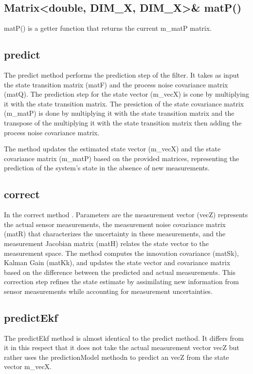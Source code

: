 \subsection{Matrix<double, DIM\_X, DIM\_X>\& matP()}
\label{sub:matP}
matP() is a getter function that returns the current m\_matP matrix. 

\subsection{predict}
\label{sub:predict}
The predict method performs the prediction step of the filter. 
It takes as input the state transition matrix (matF) and the process noise covariance matrix (matQ). 
The prediction step for the state vector (m\_vecX) is cone by multiplying it with the state transition matrix. 
The presiction of the state covariance matrix (m\_matP) is done by multiplying it with the state transition matrix and the transpose of the multiplying it with the state transition matrix then adding the process noise covariance matrix. 


The method updates the estimated state vector (m\_vecX) and the state covariance matrix (m\_matP) based on the provided matrices, representing the prediction of the system's state in the absence of new measurements.

\subsection{correct}
\label{sub:correct}
In the correct method . 
Parameters are the measurement vector (vecZ) represents the actual sensor measurements, the measurement noise covariance matrix (matR) that characterizes the uncertainty in these measurements, and the measurement Jacobian matrix (matH) relates the state vector to the measurement space. 
\vspace{4pt}
\newline
The method computes the innovation covariance (matSk), Kalman Gain (matKk), and updates the state vector and covariance matrix based on the difference between the predicted and actual measurements. This correction step refines the state estimate by assimilating new information from sensor measurements while accounting for measurement uncertainties.

\subsection{predictEkf}
\label{sub:predictEkf}
The predictEkf method is almost identical to the predict method. 
It differs from it in this respect that it does not take the actual measurement vector vecZ but rather uses the predictionModel methodn to predict an vecZ from the state vector m\_vecX. 

